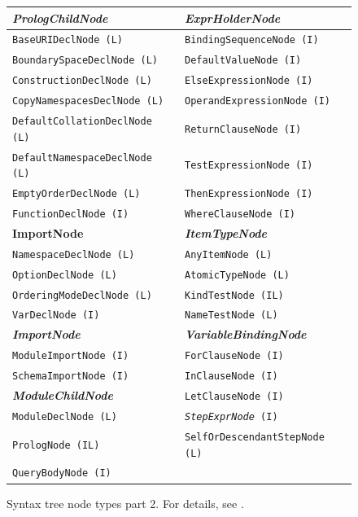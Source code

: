 \begin{figure}
\caption{Syntax tree node types part 2. For details, see \cite{thesis_schejbal}.}
\label{FIG_syntax_tree_node_types_part_2}
\begin{tabular}{l | l}
\textbf{\emph{PrologChildNode}} & \textbf{\emph{ExprHolderNode}} \\
\hline
\texttt{BaseURIDeclNode (L)} & \texttt{BindingSequenceNode (I)} \\
\texttt{BoundarySpaceDeclNode (L)} & \texttt{DefaultValueNode (I)} \\
\texttt{ConstructionDeclNode (L)} & \texttt{ElseExpressionNode (I)} \\
\texttt{CopyNamespacesDeclNode (L)} & \texttt{OperandExpressionNode (I)} \\
\texttt{DefaultCollationDeclNode (L)} & \texttt{ReturnClauseNode (I)} \\
\texttt{DefaultNamespaceDeclNode (L)} & \texttt{TestExpressionNode (I)} \\
\texttt{EmptyOrderDeclNode (L)} & \texttt{ThenExpressionNode (I)} \\
\texttt{FunctionDeclNode (I)} & \texttt{WhereClauseNode (I)} \\
\cline{2-2} \textbf{ImportNode} & \textbf{\emph{ItemTypeNode}} \\
\cline{2-2} \texttt{NamespaceDeclNode (L)} & \texttt{AnyItemNode (L)} \\
\texttt{OptionDeclNode (L)} & \texttt{AtomicTypeNode (L)} \\
\texttt{OrderingModeDeclNode (L)} & \texttt{KindTestNode (IL)} \\
\texttt{VarDeclNode (I)} & \texttt{NameTestNode (L)} \\
\cline{1-2} \textbf{\emph{ImportNode}} & \textbf{\emph{VariableBindingNode}} \\
\cline{1-2} \texttt{ModuleImportNode (I)} & \texttt{ForClauseNode (I)} \\
\texttt{SchemaImportNode (I)} & \texttt{InClauseNode (I)} \\
\cline{1-1} \textbf{\emph{ModuleChildNode}} & \texttt{LetClauseNode (I)} \\
\cline{1-2} \texttt{ModuleDeclNode (L)} & \texttt{\emph{StepExprNode} (I)} \\
\cline{2-2} \texttt{PrologNode (IL)} & \texttt{SelfOrDescendantStepNode (L)} \\
\texttt{QueryBodyNode (I)} & 
\end{tabular}
\end{figure}

